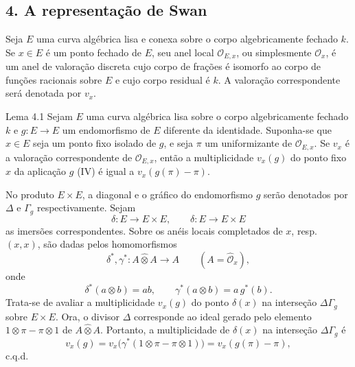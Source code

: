 \subsection*{4. A representação de Swan}

Seja $E$ uma curva algébrica lisa e conexa sobre o corpo algebricamente fechado $k$. Se $x\in E$ é um ponto fechado de $E$, seu anel local $\mathcal O_{E,x}$, ou simplesmente $\mathcal O_x$, é um anel de valoração discreta cujo corpo de frações é isomorfo ao corpo de funções racionais sobre $E$ e cujo corpo residual é $k$. A valoração correspondente será denotada por $v_x$.

\begin{statement}{Lema 4.1}
Sejam $E$ uma curva algébrica lisa sobre o corpo algebricamente fechado $k$ e $g:E\to E$ um endomorfismo de $E$ diferente da identidade. Suponha-se que $x\in E$ seja um ponto fixo isolado de $g$, e seja $\pi$ um uniformizante de $\mathcal O_{E,x}$. Se $v_x$ é a valoração correspondente de $\mathcal O_{E,x}$, então a multiplicidade $v_x(g)$ do ponto fixo $x$ da aplicação $g$ (IV) é igual a $v_x(g(\pi)-\pi)$.
\end{statement}


No produto $E\times E$, a diagonal e o gráfico do endomorfismo $g$ serão denotados por $\Delta$ e $\Gamma_g$ respectivamente. Sejam
\[
\delta:E\longrightarrow E\times E,\qquad
\delta:E\longrightarrow E\times E
\]
as imersões correspondentes. Sobre os anéis locais completados de $x$, resp. $(x,x)$, são dadas pelos homomorfismos
\[
\delta^*,\gamma^*:A\widehat\otimes A\longrightarrow A
\qquad (A=\widehat{\mathcal O}_x),
\]
onde
\[
\delta^*(a\otimes b)=ab,\qquad
\gamma^*(a\otimes b)=a\,g^*(b).
\]
Trata-se de avaliar a multiplicidade $v_x(g)$ do ponto $\delta(x)$ na interseção $\Delta\Gamma_g$ sobre $E\times E$. Ora, o divisor $\Delta$ corresponde ao ideal gerado pelo elemento $1\otimes\pi-\pi\otimes1$ de $A\widehat\otimes A$. Portanto, a multiplicidade de $\delta(x)$ na interseção $\Delta\Gamma_g$ é
\[
v_x(g)=v_x\bigl(\gamma^*(1\otimes\pi-\pi\otimes1)\bigr)
      =v_x(g(\pi)-\pi),
\]
c.q.d.

